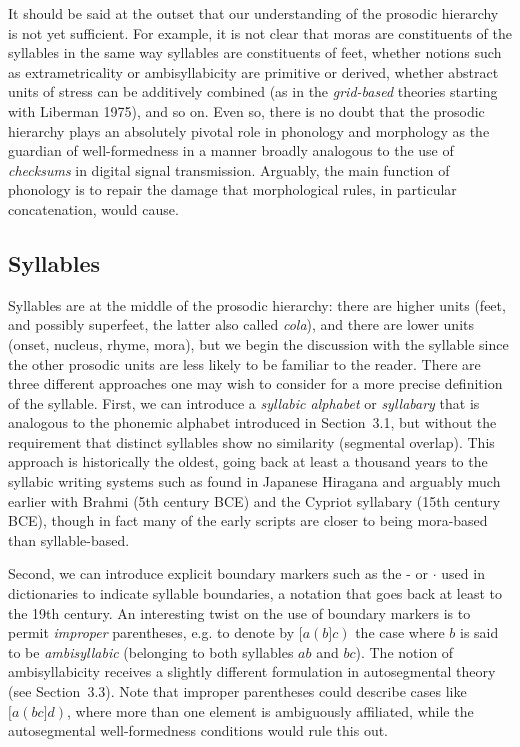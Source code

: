 It should be said at the outset that our understanding of the prosodic
hierarchy is not yet sufficient. For example, it is not clear that moras are
constituents of the syllables in the same way syllables are constituents of
feet, whether notions such as extrametricality or ambisyllabicity are
primitive or derived, whether abstract units of stress can be additively
combined (as in the {\it grid-based} theories starting with Liberman 1975),
and so on. Even so, there is no doubt that the prosodic hierarchy plays an
absolutely pivotal role in phonology and morphology as the guardian of
well-formedness in a manner broadly analogous to the use of {\it checksums}
in digital signal transmission. Arguably, the main function of phonology is to
repair the damage that morphological rules, in particular concatenation, would
cause.  \nocite{Liberman:1975}

\subsection{Syllables}

Syllables are at the middle of the prosodic hierarchy: there are higher units
(feet, and possibly superfeet, the latter also called {\it cola}), and there
are lower units (onset, nucleus, rhyme, mora), but we begin the discussion
with the syllable since the other prosodic units are less likely to be
familiar to the reader.  There are three different approaches one may wish to
consider for a more precise definition of the syllable.  First, we can
introduce a {\it syllabic alphabet} or {\it syllabary} that is analogous to the phonemic alphabet introduced in Section~3.1, but
without the requirement that distinct syllables show no similarity (segmental
overlap). This approach is historically the oldest, going back at least a
thousand years to the syllabic writing systems such as found in Japanese
Hiragana and arguably much earlier with Brahmi (5th century BCE) and the
Cypriot syllabary (15th century BCE), though in fact many of the early scripts
are closer to being mora-based than syllable-based. 
 

Second, we can introduce explicit boundary markers such as the - or $\cdot$
used in dictionaries to indicate syllable boundaries, a notation that goes
back at least to the 19th century. An interesting twist on the use of boundary
markers is to permit {\it improper} parentheses, e.g. to denote by $[a (b] c)$
the case where $b$ is said to be {\it ambisyllabic} (belonging to both
syllables $ab$ and $bc$). The notion of ambisyllabicity receives a slightly
different formulation in autosegmental theory (see Section~3.3).  Note that improper
parentheses could describe cases like $[a (b c ] d)$, where more than one
element is ambiguously affiliated, while the autosegmental well-formedness
conditions would rule this out.


